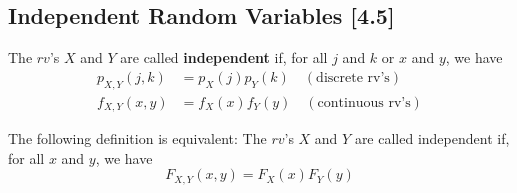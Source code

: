 \documentclass[a4paper,9pt]{extarticle}
\begin{document}
\begin{multicols*}{2}
\subsection{Independent Random Variables [4.5]}
The $rv$'s $X$ and $Y$ are called \textbf{independent} if, for all $j$ and $k$ or $x$ and $y$, we have
\begin{equation}
    \begin{split}
        p_{X,Y}(j,k) & = p_X(j) p_Y(k) \quad (\text{discrete rv's}) \\
        f_{X,Y}(x,y) & = f_X(x) f_Y(y) \quad (\text{continuous rv's})
    \end{split}
\end{equation}

The following definition is equivalent: The $rv$'s $X$ and $Y$ are called independent if, for all $x$ and $y$, we have
\begin{equation}
    F_{X,Y}(x,y) = F_X(x) F_Y(y)
\end{equation}

\end{multicols*}
\end{document}
